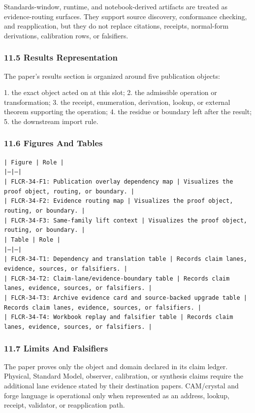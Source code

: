 \documentclass[11pt]{article}
\begin{document}
Standards-window, runtime, and notebook-derived artifacts are treated
as evidence-routing surfaces. They support source discovery, conformance
checking, and reapplication, but they do not replace citations, receipts,
normal-form derivations, calibration rows, or falsifiers.

\subsubsection*{11.5 Results Representation}

The paper's results section is organized around five publication objects:

1. the exact object acted on at this slot;
2. the admissible operation or transformation;
3. the receipt, enumeration, derivation, lookup, or external theorem supporting
   the operation;
4. the residue or boundary left after the result;
5. the downstream import rule.

\subsubsection*{11.6 Figures And Tables}

\noindent\texttt{| Figure | Role |}\\
\noindent\texttt{|---|---|}\\
\noindent\texttt{| FLCR-34-F1: Publication overlay dependency map | Visualizes the proof object, routing, or boundary. |}\\
\noindent\texttt{| FLCR-34-F2: Evidence routing map | Visualizes the proof object, routing, or boundary. |}\\
\noindent\texttt{| FLCR-34-F3: Same-family lift context | Visualizes the proof object, routing, or boundary. |}\\

\noindent\texttt{| Table | Role |}\\
\noindent\texttt{|---|---|}\\
\noindent\texttt{| FLCR-34-T1: Dependency and translation table | Records claim lanes, evidence, sources, or falsifiers. |}\\
\noindent\texttt{| FLCR-34-T2: Claim-lane/evidence-boundary table | Records claim lanes, evidence, sources, or falsifiers. |}\\
\noindent\texttt{| FLCR-34-T3: Archive evidence card and source-backed upgrade table | Records claim lanes, evidence, sources, or falsifiers. |}\\
\noindent\texttt{| FLCR-34-T4: Workbook replay and falsifier table | Records claim lanes, evidence, sources, or falsifiers. |}\\

\subsubsection*{11.7 Limits And Falsifiers}

The paper proves only the object and domain declared in its claim ledger.
Physical, Standard Model, observer, calibration, or synthesis claims require
the additional lane evidence stated by their destination papers. CAM/crystal
and forge language is operational only when represented as an address, lookup,
receipt, validator, or reapplication path.
\end{document}
